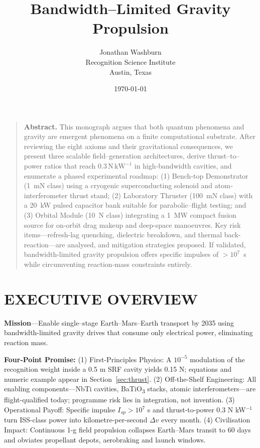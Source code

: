 \documentclass[12pt,letterpaper]{article}
\title{Bandwidth--Limited Gravity Propulsion}
\author{Jonathan Washburn\\Recognition Science Institute\\Austin, Texas}
\date{\today}
\begin{document}
\maketitle

\begin{quotation}
\noindent\textbf{Abstract.} This monograph argues that both quantum phenomena and gravity are emergent phenomena on a finite computational substrate. After reviewing the eight axioms and their gravitational consequences, we present three scalable field–generation architectures, derive thrust–to–power ratios that reach $0.3\,\mathrm{N\,kW^{-1}}$ in high‐bandwidth cavities, and enumerate a phased experimental roadmap: (1) Bench‐top Demonstrator (1~mN class) using a cryogenic superconducting solenoid and atom‐interferometer thrust stand; (2) Laboratory Thruster (100~mN class) with a 20~kW pulsed capacitor bank suitable for parabolic–flight testing; and (3) Orbital Module (10~N class) integrating a 1~MW compact fusion source for on-orbit drag makeup and deep-space manoeuvres. Key risk items—refresh-lag quenching, dielectric breakdown, and thermal back-reaction—are analysed, and mitigation strategies proposed. If validated, bandwidth-limited gravity propulsion offers specific impulses of $>10^7$~s while circumventing reaction‐mass constraints entirely.
\end{quotation}

\section*{EXECUTIVE OVERVIEW}

\noindent\textbf{Mission}—Enable single–stage Earth–Mars–Earth transport by 2035 using bandwidth-limited gravity drives that consume only electrical power, eliminating reaction mass.

\noindent\textbf{Four-Point Promise:} (1) First-Principles Physics: A $10^{-5}$ modulation of the recognition weight inside a 0.5 m SRF cavity yields 0.15 N; equations and numeric example appear in Section~\ref{sec:thrust}. (2) Off-the-Shelf Engineering: All enabling components—NbTi cavities, BaTiO\textsubscript{3} stacks, atomic interferometers—are flight-qualified today; programme risk lies in integration, not invention. (3) Operational Payoff: Specific impulse $I_{sp}>10^{7}$ s and thrust-to-power 0.3 N kW$^{-1}$ turn ISS-class power into kilometre-per-second $\Delta v$ every month. (4) Civilisation Impact: Continuous 1-g field propulsion collapses Earth–Mars transit to 60 days and obviates propellant depots, aerobraking and launch windows.
\end{document}
